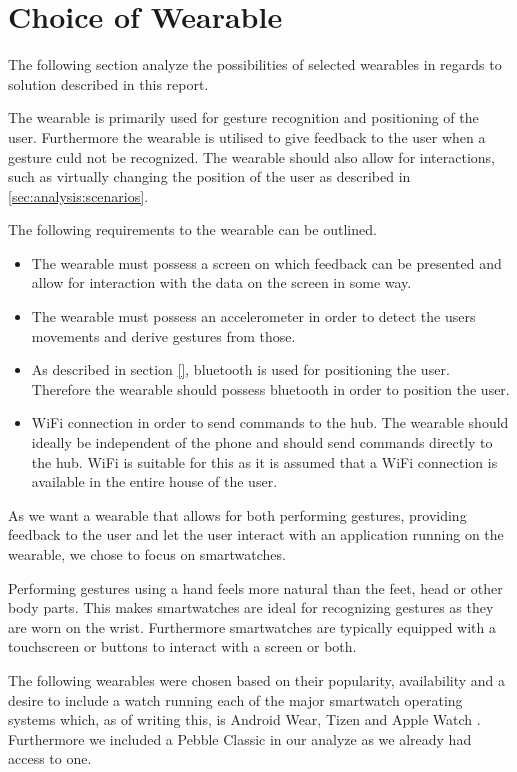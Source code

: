 \section{Choice of Wearable}
\label{sec:analysis:choice-of-wearables}

The following section analyze the possibilities of selected wearables in regards to solution described in this report.

The wearable is primarily used for gesture recognition and positioning of the user. Furthermore the wearable is utilised to give feedback to the user when a gesture culd not be recognized. The wearable should also allow for interactions, such as virtually changing the position of the user as described in \cref{sec:analysis:scenarios}.

The following requirements to the wearable can be outlined.

\begin{itemize}
\item The wearable must possess a screen on which feedback can be presented and allow for interaction with the data on the screen in some way.
\item The wearable must possess an accelerometer in order to detect the users movements and derive gestures from those.
\item As described in section \cref{}, bluetooth is used for positioning the user. Therefore the wearable should possess bluetooth in order to position the user. 
\item WiFi connection in order to send commands to the hub. The wearable should ideally be independent of the phone and should send commands directly to the hub. WiFi is suitable for this as it is assumed that a WiFi connection is available in the entire house of the user.
\end{itemize}

As we want a wearable that allows for both performing gestures, providing feedback to the user and let the user interact with an application running on the wearable, we chose to focus on smartwatches.

Performing gestures using a hand feels more natural than the feet, head or other body parts. This makes smartwatches are ideal for recognizing gestures as they are worn on the wrist. Furthermore smartwatches are typically equipped with a touchscreen or buttons to interact with a screen or both.

The following wearables were chosen based on their popularity, availability and a desire to include a watch running each of the major smartwatch operating systems which, as of writing this, is Android Wear, Tizen and Apple Watch . Furthermore we included a Pebble Classic in our analyze as we already had access to one.

